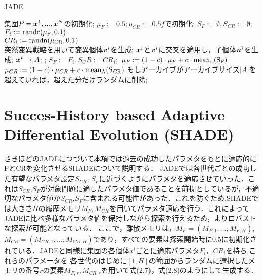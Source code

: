 \documentclass[a4paper,11pt,oneside,openany]{jsbook}
\def\vector#1{\mbox{\boldmath $#1$}}
\begin{document}
\begin{algorithm}
\caption{JADE}
\label{alg:pbnf}
\begin{algorithmic}
\STATE 集団$P={\vector{x}^1,...,\vector{x}^N}$の初期化;
\STATE  $\mu_F := 0.5; \mu_{CR} := 0.5f$で初期化;
    \STATE $S_F := \emptyset, S_{CR} := \emptyset$;
        \STATE $F_i := \rm{randc}(\mu _F, 0.1)$ \\
        \STATE $CR_i := \rm{randn}(\mu _{CR}, 0.1)$ \\
        \STATE 突然変異戦略を用いて変異個体{$\vector{v}^i$}を生成;
        \STATE $\vector{x}^i$と$\vector{v}^i$に交叉を適用し，子個体$\vector{u}^i$を生成;
    \ENDFOR
        \IF {$f(\vector{u}^i) \leqq f(\vector{x}^i)$}
            \STATE $\vector{x^i} \rightarrow {A}$;
            \STATE {$\vector{x}^i:=\vector{u}^i$};
            \STATE $S_F := {F_i}, S_CR := {CR_i};$
        \ENDIF
    \ENDFOR
        \STATE $\mu_F := (1 - c)\cdot\mu _F + c\cdot \rm{mean}_L(S_F)$
        \STATE $\mu_{CR} := (1 - c)\cdot\mu _{CR} + c\cdot  \rm{mean}_A(S_{CR})$
    \ENDIF
    \STATE もしアーカイブがアーカイブサイズ$|A|$を超えていれば，超えた分だけランダムに削除;
\ENDWHILE
\end{algorithmic}
\end{algorithm}

\section{Succes-History based Adaptive Differential Evolution (SHADE)}
さきほどのJADEにつづいて本項では過去の成功したパラメタをもとに適応的にFとCRを変化させるSHADEについて説明する．
JADEでは各世代ごとの成功した有望なパラメタ設定$S_{CR}$, $S_{F}$に近づくようにパラメタを適応させていった．これは$S_{CR}$,$S_F$が対象問題に適したパラメタ値であることを前提としているが，不適切なパラメタ値が$S_{CR}$,$S_F$に含まれる可能性があった．これを防ぐため,SHADEでは大きさ$H$の履歴メモリ$M_F,M_{CR}$を用いてパラメタ適応を行う．これによってJADEに比べ多様なパラメタ値を保持しながら探索を行えるため，よりロバストな探索が可能となっている．
ここで，離散メモリは，$M_F = (M_{F,1},...,M_{F,H})$,$M_{CR}= (M_{CR,1},...,M_{CR,H})$であり，すべての要素は探索開始時に0.5に初期化されている．JADEと同様に集団の各個体\vector{x^i}ごとに適応パラメタ$F_i$，$CR_i$を持ち,これらのパラメータを
各世代のはじめに$[1,H]$の範囲からランダムに選択したメモリの番号$r$の要素$M_{F,r},M_{CR,r}$を用いて式(2.7)，式(2.8)のようにして生成する．
\end{document}
